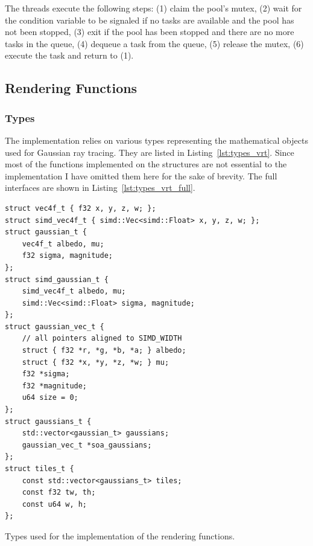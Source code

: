 \documentclass[a4paper, 11pt]{memoir}
\begin{document}
    The threads execute the following steps: (1) claim the pool's mutex, (2) wait for the condition variable to be
    signaled if no tasks are available and the pool has not been stopped, (3) exit if the pool has been stopped and
    there are no more tasks in the queue, (4) dequeue a task from the queue, (5) release the mutex, (6) execute the task
    and return to (1).


    \subsection{Rendering Functions}
    \label{sec:rendering_functions}

    \subsubsection{Types}
    The implementation relies on various types representing the mathematical objects used for Gaussian ray tracing. They
    are listed in Listing~\ref{lst:types_vrt}. Since most of the functions implemented on the structures are not essential
    to the implementation I have omitted them here for the sake of brevity. The full interfaces are shown in Listing~\ref{lst:types_vrt_full}.
    \begin{listing}[H]
        \begin{verbatim}
struct vec4f_t { f32 x, y, z, w; };
struct simd_vec4f_t { simd::Vec<simd::Float> x, y, z, w; };
struct gaussian_t {
    vec4f_t albedo, mu;
    f32 sigma, magnitude;
};
struct simd_gaussian_t {
    simd_vec4f_t albedo, mu;
    simd::Vec<simd::Float> sigma, magnitude;
};
struct gaussian_vec_t {
    // all pointers aligned to SIMD_WIDTH
    struct { f32 *r, *g, *b, *a; } albedo;
    struct { f32 *x, *y, *z, *w; } mu;
    f32 *sigma;
    f32 *magnitude;
    u64 size = 0;
};
struct gaussians_t {
    std::vector<gaussian_t> gaussians;
    gaussian_vec_t *soa_gaussians;
};
struct tiles_t {
    const std::vector<gaussians_t> tiles;
    const f32 tw, th;
    const u64 w, h;
};
        \end{verbatim}
        \caption{Types used for the implementation of the rendering functions.}
        \label{lst:types_vrt}
    \end{listing}
\end{document}
